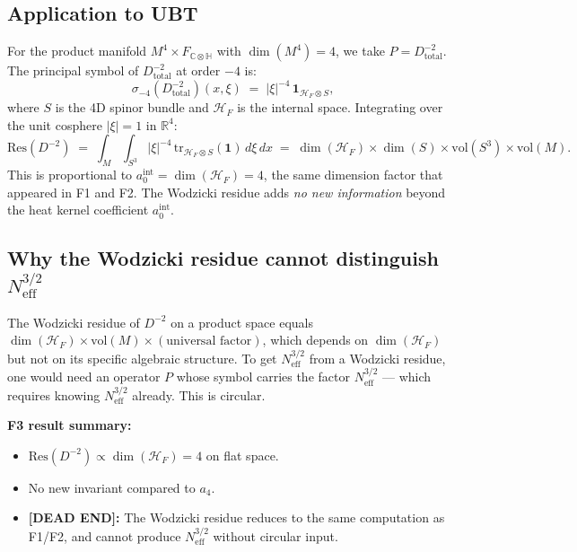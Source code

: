 \documentclass[11pt,a4paper]{article}
\theoremstyle{definition}
\theoremstyle{remark}
\begin{document}
\subsection{Application to UBT}

For the product manifold $M^4 \times F_{\mathbb{C}\otimes\mathbb{H}}$ with
$\dim(M^4) = 4$, we take $P = D_{\mathrm{total}}^{-2}$.
The principal symbol of $D_{\mathrm{total}}^{-2}$ at order $-4$ is:
\begin{equation}
  \sigma_{-4}(D_{\mathrm{total}}^{-2})(x,\xi)
  \;=\; |\xi|^{-4} \,\mathbf{1}_{\mathcal{H}_F \otimes S},
  \label{eq:sigma4}
\end{equation}
where $S$ is the 4D spinor bundle and $\mathcal{H}_F$ is the internal space.
Integrating over the unit cosphere $|ξ| = 1$ in $\mathbb{R}^4$:
\begin{equation}
  \mathrm{Res}(D^{-2})
  \;=\; \int_M \int_{S^3} |\xi|^{-4}\,\mathrm{tr}_{\mathcal{H}_F \otimes S}
    (\mathbf{1})\,d\xi\,dx
  \;=\; \dim(\mathcal{H}_F) \times \dim(S) \times \mathrm{vol}(S^3) \times \mathrm{vol}(M).
  \label{eq:Res_result}
\end{equation}
This is proportional to $a_0^{\mathrm{int}} = \dim(\mathcal{H}_F) = 4$, the
same dimension factor that appeared in F1 and F2.
The Wodzicki residue adds \emph{no new information} beyond the heat kernel
coefficient $a_0^{\mathrm{int}}$.

\subsection{Why the Wodzicki residue cannot distinguish $N_{\mathrm{eff}}^{3/2}$}

The Wodzicki residue of $D^{-2}$ on a product space equals
$\dim(\mathcal{H}_F) \times \mathrm{vol}(M) \times (\text{universal factor})$,
which depends on $\dim(\mathcal{H}_F)$ but not on its specific algebraic
structure.
To get $N_{\mathrm{eff}}^{3/2}$ from a Wodzicki residue, one would need an
operator $P$ whose symbol carries the factor $N_{\mathrm{eff}}^{3/2}$ — which
requires knowing $N_{\mathrm{eff}}^{3/2}$ already.
This is circular.

\textbf{F3 result summary:}
\begin{itemize}
  \item $\mathrm{Res}(D^{-2}) \propto \dim(\mathcal{H}_F) = 4$ on flat space.
  \item No new invariant compared to $a_4$.
  \item \textbf{[DEAD END]:} The Wodzicki residue reduces to the same computation
    as F1/F2, and cannot produce $N_{\mathrm{eff}}^{3/2}$ without circular
    input.
\end{itemize}
\end{document}
